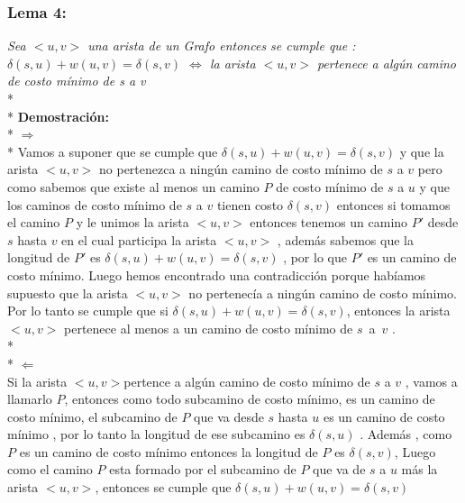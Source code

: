 \documentclass{article}
\begin{document}
    \subsubsection{Lema 4:}
    \textit{Sea $<u,v>$ una arista de un Grafo entonces se cumple que :\\
    $\delta\left(s,u\right) + w \left(u,v\right) = \delta\left(s,v\right)$ $\Longleftrightarrow$ la arista $<u,v>$ pertenece 
    a alg\'un camino de costo m\'inimo de s a v}
    \\*
    \\*
    \noindent \textbf{Demostraci\'on:}
    \\*
    $\Longrightarrow$
    \\*
    Vamos a suponer que  se cumple que $\delta\left(s,u\right) + w \left(u,v\right) = \delta\left(s,v\right)$ y que la arista $<u,v>$ no pertenezca 
    a ning\'un camino de costo m\'inimo  de $s$ a $v$ pero como sabemos que existe al menos un camino $P$ de costo m\'inimo de $s$ a $u$  y que los caminos de costo m\'inimo de 
    $s$ a $v$ tienen costo $\delta\left(s,v\right)$ entonces si tomamos el camino $P$  y le unimos la arista $<u,v>$ entonces tenemos un camino $P'$ desde $s$ hasta $v$ en el cual participa la arista $<u,v>$ , 
    adem\'as sabemos que la longitud de $P'$ es $\delta\left(s,u\right) + w \left(u,v\right) = \delta\left(s,v\right)$ , por lo que $P'$ es un camino de costo m\'inimo. Luego hemos encontrado una contradicci\'on porque hab\'iamos supuesto que la 
    arista $<u,v>$ no pertenec\'ia a ning\'un camino de costo m\'inimo. Por lo tanto se cumple que si $\delta\left(s,u\right) + w \left(u,v\right) = \delta\left(s,v\right)$, entonces la arista $<u,v>$ 
    pertenece al menos a un camino de costo m\'inimo de $s$~a~$v$ . 
    \\*
    \\*
    \noindent $\Longleftarrow $\\
    Si la arista $<u,v>$pertence a alg\'un camino de costo m\'inimo de $s$ a $v$ , vamos a llamarlo $P$, entonces como todo subcamino de costo m\'inimo, 
    es un camino de costo m\'inimo, el subcamino de $P$ que va desde  $s$ hasta $u$ es un camino de costo m\'inimo , por lo tanto la longitud de ese subcamino es $\delta\left(s,u\right)$ . Adem\'as , como $P$ es  un camino de 
    costo m\'inimo entonces la longitud de $P$ es $\delta\left(s,v\right)$, Luego como el camino $P$ esta formado por el subcamino de $P$ que va de $s$ a $u$ m\'as la arista $<u,v>$, entonces se cumple que $\delta\left(s,u\right) + w\left(u,v\right) = \delta\left(s,v\right)$
\end{document}
